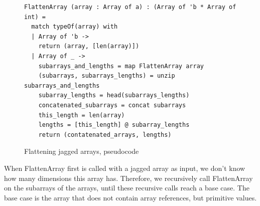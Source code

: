 \begin{figure}[h]
  \centering
\begin{verbatim}
FlattenArray (array : Array of a) : (Array of 'b * Array of int) =
  match typeOf(array) with
  | Array of 'b ->
    return (array, [len(array)])
  | Array of _ ->
    subarrays_and_lengths = map FlattenArray array
    (subarrays, subarrays_lengths) = unzip subarrays_and_lengths
    subarray_lengths = head(subarrays_lengths)
    concatenated_subarrays = concat subarrays
    this_length = len(array)
    lengths = [this_length] @ subarray_lengths
    return (contatenated_arrays, lengths)
\end{verbatim}
  \caption{Flattening jagged arrays, pseudocode}
  \label{fig:flattenarray}
\end{figure}

When FlattenArray first is called with a jagged array as input, we don't know
how many dimensions this array has. Therefore, we recursively call FlattenArray
on the subarrays of the arrays, until these recursive calls reach a base case.
The base case is the array that does not contain array references, but primitive
values.

